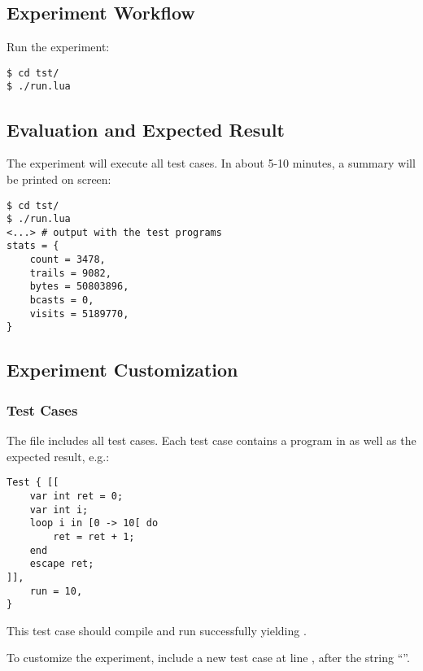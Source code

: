{%
\subsection{Experiment Workflow}

Run the experiment:

\begin{verbatim}
$ cd tst/
$ ./run.lua
\end{verbatim}

\subsection{Evaluation and Expected Result}

The experiment will execute all test cases.
In about 5-10 minutes, a summary will be printed on screen:

\begin{verbatim}
$ cd tst/
$ ./run.lua
<...> # output with the test programs
stats = {
    count = 3478,
    trails = 9082,
    bytes = 50803896,
    bcasts = 0,
    visits = 5189770,
}
\end{verbatim}

\subsection{Experiment Customization}

\subsubsection{Test Cases}

The file  includes all test cases.
Each test case contains a program in \CEU as well as the expected result, e.g.:

\begin{verbatim}
Test { [[
    var int ret = 0;
    var int i;
    loop i in [0 -> 10[ do
        ret = ret + 1;
    end
    escape ret;
]],
    run = 10,
}
\end{verbatim}

This test case should compile and run successfully yielding .

To customize the experiment, include a new test case at line , after
the string ``''.

}
